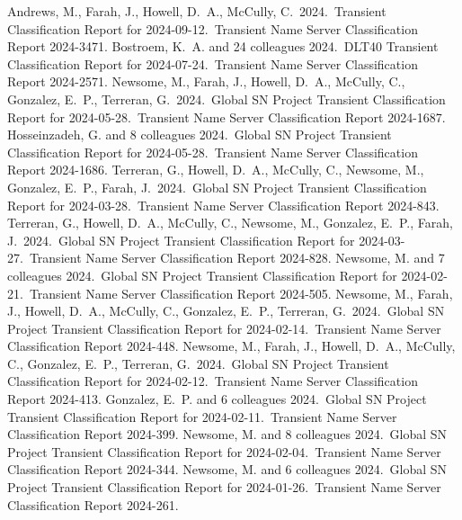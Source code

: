\documentclass[margin,line]{res}
\begin{document}
\begin{resume}
 Andrews, M., Farah, J., Howell, D.~A., McCully, C.\ 2024.\ Transient Classification Report for 2024-09-12.\ Transient Name Server Classification Report 2024-3471.
 Bostroem, K.~A. and 24 colleagues 2024.\ DLT40 Transient Classification Report for 2024-07-24.\ Transient Name Server Classification Report 2024-2571.
 Newsome, M., Farah, J., Howell, D.~A., McCully, C., Gonzalez, E.~P., Terreran, G.\ 2024.\ Global SN Project Transient Classification Report for 2024-05-28.\ Transient Name Server Classification Report 2024-1687.
 Hosseinzadeh, G. and 8 colleagues 2024.\ Global SN Project Transient Classification Report for 2024-05-28.\ Transient Name Server Classification Report 2024-1686.
 Terreran, G., Howell, D.~A., McCully, C., Newsome, M., Gonzalez, E.~P., Farah, J.\ 2024.\ Global SN Project Transient Classification Report for 2024-03-28.\ Transient Name Server Classification Report 2024-843.
 Terreran, G., Howell, D.~A., McCully, C., Newsome, M., Gonzalez, E.~P., Farah, J.\ 2024.\ Global SN Project Transient Classification Report for 2024-03-27.\ Transient Name Server Classification Report 2024-828.
 Newsome, M. and 7 colleagues 2024.\ Global SN Project Transient Classification Report for 2024-02-21.\ Transient Name Server Classification Report 2024-505.
 Newsome, M., Farah, J., Howell, D.~A., McCully, C., Gonzalez, E.~P., Terreran, G.\ 2024.\ Global SN Project Transient Classification Report for 2024-02-14.\ Transient Name Server Classification Report 2024-448.
 Newsome, M., Farah, J., Howell, D.~A., McCully, C., Gonzalez, E.~P., Terreran, G.\ 2024.\ Global SN Project Transient Classification Report for 2024-02-12.\ Transient Name Server Classification Report 2024-413.
 Gonzalez, E.~P. and 6 colleagues 2024.\ Global SN Project Transient Classification Report for 2024-02-11.\ Transient Name Server Classification Report 2024-399.
 Newsome, M. and 8 colleagues 2024.\ Global SN Project Transient Classification Report for 2024-02-04.\ Transient Name Server Classification Report 2024-344.
 Newsome, M. and 6 colleagues 2024.\ Global SN Project Transient Classification Report for 2024-01-26.\ Transient Name Server Classification Report 2024-261.

\end{resume}
\end{document}
